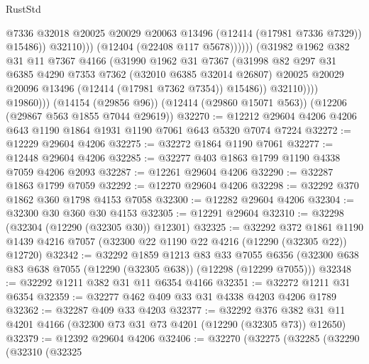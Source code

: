 \begin{lexlean}{RustStd}
\begin{coremodule}
                                  @7336
                                  @32018
                                  @20025
                                  @20029
                                  @20063
                                  @13496
                                  (@12414 (@17981 @7336 @7329))
                                  @15486))
                              @32110)))
                        (@12404 (@22408 @117 @5678))))))
                (@31982
                  @1962
                  @382
                  @31
                  @11
                  @7367
                  @4166
                  (@31990
                    @1962
                    @31
                    @7367
                    (@31998
                      @82
                      @297
                      @31
                      @6385
                      @4290
                      @7353
                      @7362
                      (@32010 @6385 @32014 @26807)
                      @20025
                      @20029
                      @20096
                      @13496
                      (@12414 (@17981 @7362 @7354))
                      @15486))
                  @32110))))
          @19860)))
    (@14154 (@29856 @96))
    (@12414 (@29860 @15071 @563))
    (@12206 (@29867 @563 @1855 @7044 @29619))
@32270 := @12212 @29604 @4206 @4206 @643 @1190 @1864 @1931 @1190 @7061 @643 @5320 @7074 @7224
@32272 := @12229 @29604 @4206
@32275 := @32272 @1864 @1190 @7061
@32277 := @12448 @29604 @4206
@32285 := @32277 @403 @1863 @1799 @1190 @4338 @7059 @4206 @2093
@32287 := @12261 @29604 @4206
@32290 := @32287 @1863 @1799 @7059
@32292 := @12270 @29604 @4206
@32298 := @32292 @370 @1862 @360 @1798 @4153 @7058
@32300 := @12282 @29604 @4206
@32304 := @32300 @30 @360 @30 @4153
@32305 := @12291 @29604
@32310 := @32298 (@32304 (@12290 (@32305 @30)) @12301)
@32325 := @32292
    @372
    @1861
    @1190
    @1439
    @4216
    @7057
    (@32300 @22 @1190 @22 @4216 (@12290 (@32305 @22)) @12720)
@32342 := @32292
    @1859
    @1213
    @83
    @33
    @7055
    @6356
    (@32300 @638 @83 @638 @7055 (@12290 (@32305 @638)) (@12298 (@12299 @7055)))
@32348 := @32292 @1211 @382 @31 @11 @6354 @4166
@32351 := @32272 @1211 @31 @6354
@32359 := @32277 @462 @409 @33 @31 @4338 @4203 @4206 @1789
@32362 := @32287 @409 @33 @4203
@32377 := @32292
    @376
    @382
    @31
    @11
    @4201
    @4166
    (@32300 @73 @31 @73 @4201 (@12290 (@32305 @73)) @12650)
@32379 := @12392 @29604 @4206
@32406 := @32270
    (@32275
      (@32285
        (@32290
          (@32310
            (@32325

\end{coremodule}
\end{lexlean}
